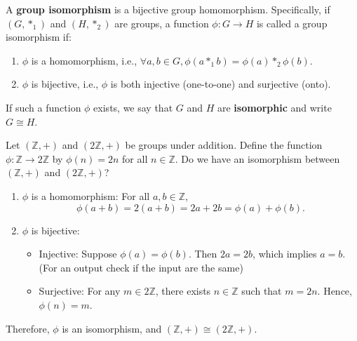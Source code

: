 \begin{definition}
    A \textbf{group isomorphism} is a bijective group homomorphism. Specifically, if $(G, *_1)$ and $(H, *_2)$ are groups, a function $\phi: G \to H$ is called a group isomorphism if:
    \begin{enumerate}
        \item $\phi$ is a homomorphism, i.e., $\forall a, b \in G, \phi(a *_1 b) = \phi(a) *_2 \phi(b)$.
        \item $\phi$ is bijective, i.e., $\phi$ is both injective (one-to-one) and surjective (onto).
    \end{enumerate}
    If such a function $\phi$ exists, we say that $G$ and $H$ are \textbf{isomorphic} and write $G \cong H$.
\end{definition}
\begin{exercise}
    Let $(\mathbb{Z}, +)$ and $(2\mathbb{Z}, +)$ be groups under addition. Define the function $\phi: \mathbb{Z} \to 2\mathbb{Z}$ by $\phi(n) = 2n$ for all $n \in \mathbb{Z}$. 
    Do we have an isomorphism between $(\mathbb{Z}, +)$ and $(2\mathbb{Z}, +)$?
\end{exercise}
\begin{answer}
    \begin{enumerate}
        \item $\phi$ is a homomorphism: For all $a, b \in \mathbb{Z}$,
        \[
        \phi(a + b) = 2(a + b) = 2a + 2b = \phi(a) + \phi(b).
        \]
        \item $\phi$ is bijective:
        \begin{itemize}
            \item Injective: Suppose $\phi(a) = \phi(b)$. Then $2a = 2b$, which implies $a = b$. (For an output check if the input are the same)
            \item Surjective: For any $m \in 2\mathbb{Z}$, there exists $n \in \mathbb{Z}$ such that $m = 2n$. Hence, $\phi(n) = m$.
        \end{itemize}
    \end{enumerate}
    Therefore, $\phi$ is an isomorphism, and $(\mathbb{Z}, +) \cong (2\mathbb{Z}, +)$.
\end{answer}


